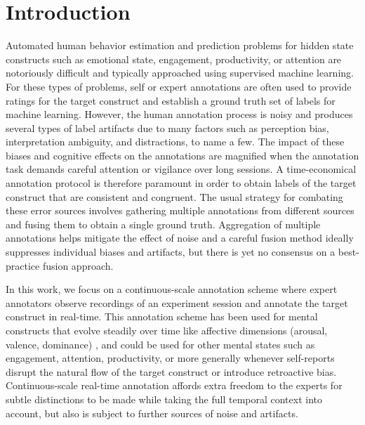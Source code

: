 \documentclass[times,twocolumn,final,authoryear]{elsarticle}
\begin{document}
\section{Introduction}
Automated human behavior estimation and prediction problems for hidden state constructs such as emotional state, engagement, productivity, or attention are notoriously difficult and typically approached using supervised machine learning.  For these types of problems, self or expert annotations are often used to provide ratings for the target construct and establish a ground truth set of labels for machine learning.  However, the human annotation process is noisy and produces several types of label artifacts due to many factors such as perception bias, interpretation ambiguity, and distractions, to name a few.  The impact of these biases and cognitive effects on the annotations are magnified when the annotation task demands careful attention or vigilance over long sessions.  A time-economical annotation protocol is therefore paramount in order to obtain labels of the target construct that are consistent and congruent.  The usual strategy for combating these error sources involves gathering multiple annotations from different sources and fusing them to obtain a single ground truth.  Aggregation of multiple annotations helps mitigate the effect of noise and a careful fusion method ideally suppresses individual biases and artifacts, but there is yet no consensus on a best-practice fusion approach.

In this work, we focus on a continuous-scale annotation scheme where expert annotators observe recordings of an experiment session and annotate the target construct in real-time.  This annotation scheme has been used for mental constructs that evolve steadily over time like affective dimensions (arousal, valence, dominance) \citep{mckeown2012semaine, metallinou2013tracking, metallinou2013annotation, ringeval2013introducing, valstar2016avec}, and could be used for other mental states such as engagement, attention, productivity, or more generally whenever self-reports disrupt the natural flow of the target construct or introduce retroactive bias.  Continuous-scale real-time annotation affords extra freedom to the experts for subtle distinctions to be made while taking the full temporal context into account, but also is subject to further sources of noise and artifacts.
\end{document}
